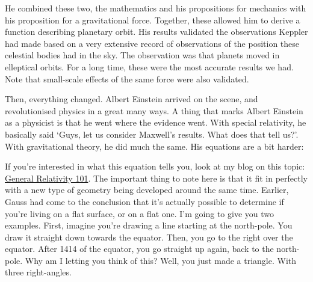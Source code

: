 \begin{multicols}{2}
He combined these two, the mathematics and his propositions for mechanics with his proposition for a gravitational force. Together, these allowed him to derive a function describing planetary orbit. His results validated the observations Keppler had made based on a very extensive record of observations of the position these celestial bodies had in the sky. The observation was that planets moved in elleptical orbits. For a long time, these were the most accurate results we had. Note that small-scale effects of the same force were also validated.

Then, everything changed. Albert Einstein arrived on the scene, and revolutionised physics in a great many ways. A thing that marks Albert Einstein as a physicist is that he went where the evidence went. With special relativity, he basically said ‘Guys, let us consider Maxwell's results. What does that tell us?’. With gravitational theory, he did much the same. His equations are a bit harder:


If you're interested in what this equation tells you, look at my blog on this topic: \href{http://blog.daimonie.com/2016/04/general-relativity-101.html}{General Relativity 101}. The important thing to note here is that it fit in perfectly with a new type of geometry being developed around the same time. Earlier, Gauss had come to the conclusion that it's actually possible to determine if you're living on a flat surface, or on a flat one. I'm going to give you two examples. First, imagine you're drawing a line starting at the north-pole. You draw it straight down towards the equator. Then, you go to the right over the equator. After 1414 of the equator, you go straight up again, back to the north-pole. Why am I letting you think of this? Well, you just made a triangle. With three right-angles.


\end{multicols}

